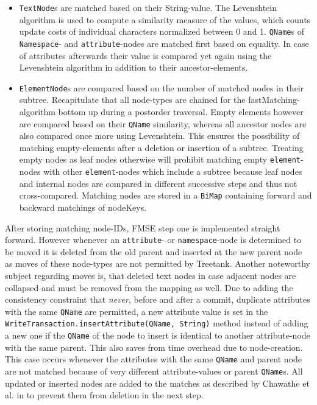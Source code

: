 \begin{itemize}
\item \texttt{TextNode}s are matched based on their String-value. The Levenshtein algo\-rithm is used to compute a similarity measure of the values, which counts update costs of individual characters normalized between 0 and 1. \texttt{QName}s of \texttt{Namespace}- and \texttt{attribute}-nodes are matched first based on equality. In case of attributes afterwards their value is compared yet again using the Levenshtein algorithm in addition to their ancestor-elements.

\item \texttt{ElementNode}s are compared based on the number of matched nodes in their subtree. Recapitulate that all node-types are chained for the fast\-Matching-algorithm bottom up during a postorder traversal. Empty elements however are compared based on their \texttt{QName} similarity, whereas all ancestor nodes are also compared once more using Levenshtein. This ensures the possibility of matching empty-elements after a deletion or insertion of a subtree. Treating empty nodes as leaf nodes otherwise will prohibit matching empty \texttt{element}-nodes with other \texttt{element}-nodes which include a subtree because leaf nodes and internal nodes are compared in different successive steps and thus not cross-compared. Matching nodes are stored in a \texttt{BiMap} containing forward and backward matchings of nodeKeys.
\end{itemize}

After storing matching node-IDs, FMSE step one is implemented straight forward. However whenever an \texttt{attribute}- or \texttt{namespace}-node is determined to be moved it is deleted from the old parent and inserted at the new parent node as moves of these node-types are not permitted by Treetank. Another noteworthy subject regarding moves is, that deleted text nodes in case adjacent nodes are collapsed and must be removed from the mapping as well. Due to adding the consistency constraint that \emph{never}, before and after a commit, duplicate attributes with the same \texttt{QName} are permitted, a new attribute value is set in the \texttt{WriteTransaction.insertAttribute(QName, String)} method instead of adding a new one if the \texttt{QName} of the node to insert is identical to another attribute-node with the same parent. This also saves from time overhead due to node-creation. This case occurs whenever the attributes with the same \texttt{QName} and parent node are not matched because of very different attribute-values or parent \texttt{QName}s. All updated or inserted nodes are added to the matches as described by Chawathe et al. in \cite{chawathe1996change} to prevent them from deletion in the next step.

